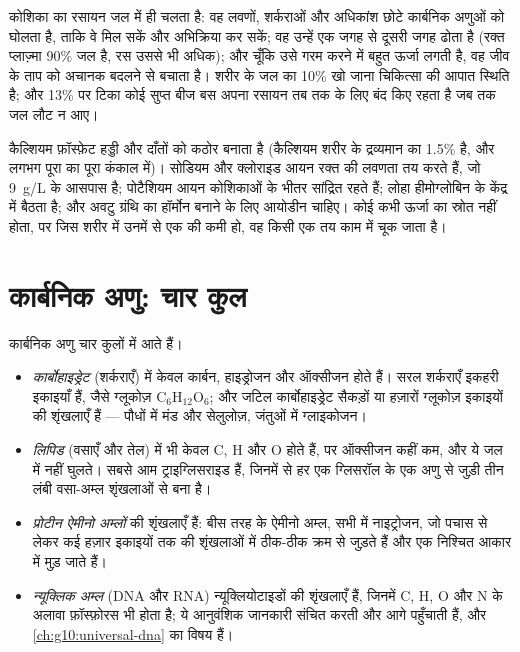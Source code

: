 \begin{proposition}[जल करता क्या है]\label{prop:g10:chemistry-of-life:water-roles}
कोशिका का रसायन जल में ही चलता है: वह लवणों, शर्कराओं और अधिकांश छोटे
कार्बनिक अणुओं को घोलता है, ताकि वे मिल सकें और अभिक्रिया कर सकें; वह
उन्हें एक जगह से दूसरी जगह ढोता है (रक्त प्लाज़्मा 90\% जल है, रस उससे
भी अधिक); और चूँकि उसे गरम करने में बहुत ऊर्जा लगती है, वह जीव के ताप को
अचानक बदलने से बचाता है। शरीर के जल का 10\% खो जाना चिकित्सा की आपात
स्थिति है; और 13\% पर टिका कोई सुप्त बीज बस अपना रसायन तब तक के लिए बंद
किए रहता है जब तक जल लौट न आए।
\end{proposition}
\admitted

\begin{example}\label{ex:g10:chemistry-of-life:salts}
कैल्शियम फ़ॉस्फ़ेट हड्डी और दाँतों को कठोर बनाता है (कैल्शियम शरीर के
द्रव्यमान का 1.5\% है, और लगभग पूरा का पूरा कंकाल में)। सोडियम और
क्लोराइड आयन रक्त की लवणता तय करते हैं, जो \qty{9}{g/L} के आसपास है;
पोटैशियम आयन कोशिकाओं के भीतर सांद्रित रहते हैं; लोहा हीमोग्लोबिन के
केंद्र में बैठता है; और अवटु ग्रंथि का हॉर्मोन बनाने के लिए आयोडीन चाहिए।
कोई  कभी ऊर्जा का स्रोत नहीं होता, पर जिस शरीर में उनमें से एक की
कमी हो, वह किसी एक तय काम में चूक जाता है।
\end{example}

\section{कार्बनिक अणु: चार कुल}

\begin{definition}[कार्बोहाइड्रेट, लिपिड, प्रोटीन, न्यूक्लिक अम्ल]\label{def:g10:chemistry-of-life:families}
कार्बनिक अणु चार कुलों में आते हैं।
\begin{itemize}
  \item \emph{कार्बोहाइड्रेट} (शर्कराएँ) में केवल
        कार्बन, हाइड्रोजन और ऑक्सीजन होते हैं। सरल शर्कराएँ इकहरी
        इकाइयाँ हैं, जैसे ग्लूकोज़ $\mathrm{C_6H_{12}O_6}$; और जटिल
        कार्बोहाइड्रेट सैकड़ों या हज़ारों ग्लूकोज़ इकाइयों की
        शृंखलाएँ हैं --- पौधों में मंड और सेलुलोज़, जंतुओं में ग्लाइकोजन।
  \item \emph{लिपिड} (वसाएँ और तेल) में भी केवल C, H और O
        होते हैं, पर ऑक्सीजन कहीं कम, और ये जल में नहीं घुलते। सबसे आम
        ट्राइग्लिसराइड हैं, जिनमें से हर एक ग्लिसरॉल के एक अणु से जुड़ी
        तीन लंबी वसा-अम्ल शृंखलाओं से बना है।
  \item \emph{प्रोटीन}
        \emph{ऐमीनो अम्लों} की शृंखलाएँ हैं: बीस तरह
        के ऐमीनो अम्ल, सभी में नाइट्रोजन, जो पचास से लेकर कई हज़ार
        इकाइयों तक की शृंखलाओं में ठीक-ठीक क्रम से जुड़ते हैं और एक
        निश्चित आकार में मुड़ जाते हैं।
  \item \emph{न्यूक्लिक अम्ल} (DNA और RNA)
        न्यूक्लियोटाइडों की शृंखलाएँ हैं, जिनमें C, H, O और N के अलावा
        फ़ॉस्फ़ोरस भी होता है; ये आनुवंशिक जानकारी संचित करती और आगे
        पहुँचाती हैं, और \cref{ch:g10:universal-dna} का विषय हैं।
\end{itemize}
\end{definition}

